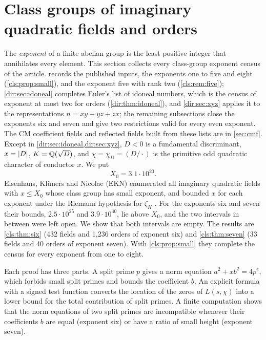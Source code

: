 \providecommand{\dirfiles}[1]{\par\smallskip\noindent
  {\footnotesize\raggedright\emph{Files:} #1.\par}\smallskip}
\providecommand{\dirP}{\mathbb{P}}
\providecommand{\dirE}{\mathbb{E}}
\providecommand{\dirU}{\mathrm{U}}
\section{Class groups of imaginary quadratic fields and orders}\label{sec:cls}

\providecommand{\clsp}{\mathfrak p}
\providecommand{\clsq}{\mathfrak q}
\providecommand{\clsXz}{X_0}

The \emph{exponent} of a finite abelian group is the least positive integer that
annihilates every element. This section collects every class-group exponent census of
the article.  records the published inputs, the exponents one to five
and eight (\cref{cls:prop:small}), and the exponent five with rank two
(\cref{cls:rem:five}); \cref{dir:sec:idoneal} completes Euler's list of idoneal numbers,
which is the census of exponent at most two for orders (\cref{dir:thm:idoneal}), and
\cref{dir:sec:xyz} applies it to the representations $n=xy+yz+zx$; the remaining
subsections close the exponents six and seven and give two restrictions valid for every
even exponent. The CM coefficient fields and reflected
fields built from these lists are in \cref{sec:cmf}. Except in
\cref{dir:sec:idoneal,dir:sec:xyz}, $D<0$ is a fundamental discriminant,
$x=\lvert D\rvert$, $K=\mathbb{Q}(\sqrt D)$, and $\chi=\chi_D=(D/\cdot)$ is the primitive odd quadratic
character of conductor $x$. We put
\[
  \clsXz=3.1\cdot10^{20}.
\]
Elsenhans, Kl\"uners and Nicolae (EKN) enumerated all imaginary quadratic fields with
$x\le\clsXz$ whose class group has small exponent, and bounded $x$ for each exponent under
the Riemann hypothesis for $\zeta_K$ \cite{Elsenhans2020Imaginary}. For the exponents six
and seven their bounds, $2.5\cdot10^{25}$ and $3.9\cdot10^{30}$, lie above $\clsXz$, and
the two intervals in between were left open. We show that both intervals are empty. The
results are \cref{cls:thm:six} (432 fields and 1{,}236 orders of exponent six) and
\cref{cls:thm:seven} (33 fields and 40 orders of exponent seven). With
\cref{cls:prop:small} they complete the census for every exponent from one to eight.

Each proof has three parts. A split prime $p$ gives a norm equation
$a^2+xb^2=4p^e$, which forbids small split primes and bounds the coefficient $b$. An
explicit formula with a signed test function converts the location of the zeros of
$L(s,\chi)$ into a lower bound for the total contribution of split primes. A finite
computation shows that the norm equations of two split primes are incompatible whenever
their coefficients $b$ are equal (exponent six) or have a ratio of small height (exponent
seven).

